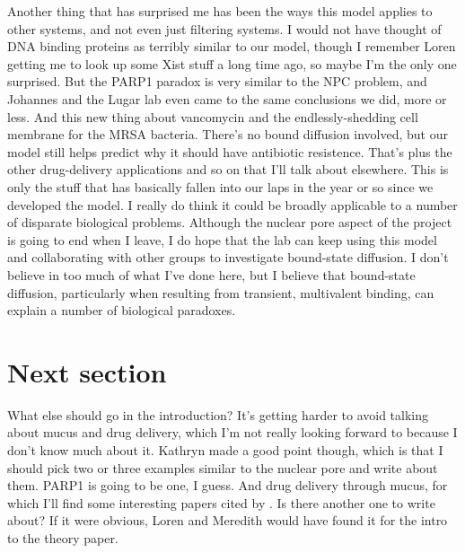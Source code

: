 {Another thing that has surprised me has been the ways this model applies to other systems, and not even just filtering systems.  I would not have thought of DNA binding proteins as terribly similar to our model, though I remember Loren getting me to look up some Xist stuff a long time ago, so maybe I'm the only one surprised.  But the PARP1 paradox is very similar to the NPC problem, and Johannes and the Lugar lab even came to the same conclusions we did, more or less.  And this new thing about vancomycin and the endlessly-shedding cell membrane for the MRSA bacteria.  There's no bound diffusion involved, but our model still helps predict why it should have antibiotic resistence.  That's plus the other drug-delivery applications and so on that I'll talk about elsewhere.  This is only the stuff that has basically fallen into our laps in the year or so since we developed the model.  I really do think it could be broadly applicable to a number of disparate biological problems.  Although the nuclear pore aspect of the project is going to end when I leave, I do hope that the lab can keep using this model and collaborating with other groups to investigate bound-state diffusion.  I don't believe in too much of what I've done here, but I believe that bound-state diffusion, particularly when resulting from transient, multivalent binding, can explain a number of biological paradoxes.

\section{Next section}

What else should go in the introduction?  It's getting harder to avoid talking about mucus and drug delivery, which I'm not really looking forward to because I don't know much about it.  Kathryn made a good point though, which is that I should pick two or three examples similar to the nuclear pore and write about them. PARP1 is going to be one, I guess.  And drug delivery through mucus, for which I'll find some interesting papers cited by \cite{witten17}.  Is there another one to write about?  If it were obvious, Loren and Meredith would have found it for the intro to the theory paper.  

}
